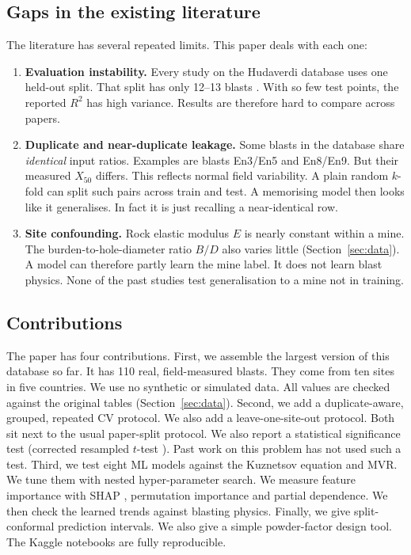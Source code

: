 \documentclass[conference]{IEEEtran}
\begin{document}
\subsection{Gaps in the existing literature}
The literature has several repeated limits. This paper deals with each one:
\begin{enumerate}
  \item \textbf{Evaluation instability.} Every study on the Hudaverdi database uses one held-out split. That split has only 12--13 blasts \cite{kulatilake2010,amoako2022}. With so few test points, the reported $R^2$ has high variance. Results are therefore hard to compare across papers.
  \item \textbf{Duplicate and near-duplicate leakage.} Some blasts in the database share \emph{identical} input ratios. Examples are blasts En3/En5 and En8/En9. But their measured $X_{50}$ differs. This reflects normal field variability. A plain random $k$-fold can split such pairs across train and test. A memorising model then looks like it generalises. In fact it is just recalling a near-identical row.
  \item \textbf{Site confounding.} Rock elastic modulus $E$ is nearly constant within a mine. The burden-to-hole-diameter ratio $B/D$ also varies little (Section~\ref{sec:data}). A model can therefore partly learn the mine label. It does not learn blast physics. None of the past studies test generalisation to a mine not in training.
\end{enumerate}

\subsection{Contributions}
The paper has four contributions. First, we assemble the largest version of this database so far. It has 110 real, field-measured blasts. They come from ten sites in five countries. We use no synthetic or simulated data. All values are checked against the original tables (Section~\ref{sec:data}). Second, we add a duplicate-aware, grouped, repeated CV protocol. We also add a leave-one-site-out protocol. Both sit next to the usual paper-split protocol. We also report a statistical significance test (corrected resampled $t$-test \cite{nadeau2003}). Past work on this problem has not used such a test. Third, we test eight ML models against the Kuznetsov equation and MVR. We tune them with nested hyper-parameter search. We measure feature importance with SHAP \cite{lundberg2017}, permutation importance and partial dependence. We then check the learned trends against blasting physics. Finally, we give split-conformal prediction intervals. We also give a simple powder-factor design tool. The Kaggle notebooks are fully reproducible.
\end{document}
